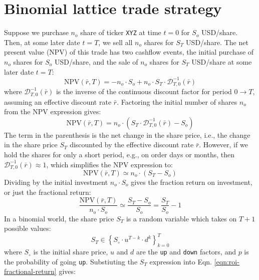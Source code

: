 \documentclass[11pt]{article}
\theoremstyle{definition}
\begin{document}
\section*{Binomial lattice trade strategy}
Suppose we purchase $n_{o}$ share of ticker \texttt{XYZ} at time $t=0$ for $S_{o}$ USD/share.
Then, at some later date $t=T$, we sell all $n_{o}$ shares for $S_{T}$ USD/share. 
The net present value (NPV) of this trade has two cashflow events, the initial purchase of $n_{o}$ shares for $S_{o}$ USD/share,
and the sale of $n_{o}$ shares for $S_{T}$ USD/share at some later date $t=T$:
\begin{equation}
\text{NPV}(\bar{r},T) = -n_{o}\cdot{S_{o}} + n_{o}\cdot{S_{T}}\cdot\mathcal{D}_{T,0}^{-1}(\bar{r})
\end{equation}
where $\mathcal{D}_{T,0}^{-1}(\bar{r})$ is the inverse of the continuous discount factor 
for period $0\rightarrow{T}$, assuming an effective discount rate $\bar{r}$. 
Factoring the initial number of shares $n_{o}$ from the NPV expression gives:
\begin{equation}
\text{NPV}(\bar{r},T) = n_{o}\cdot\left(S_{T}\cdot\mathcal{D}_{T,0}^{-1}(\bar{r}) - S_{o}\right)
\end{equation}
The term in the parenthesis is the net change in the share price, i.e., the change in the share price $S_{T}$ discounted by the effective discount rate $\bar{r}$.
However, if we hold the shares for only a short period, e.g., on order days or months, then $\mathcal{D}_{T,0}^{-1}(\bar{r})\approx{1}$, which
simplifies the NPV expression to:
\begin{equation}
\text{NPV}(\bar{r}, T) \simeq n_{o}\cdot(S_{T}-S_{o})
\end{equation}
Dividing by the initial investment $n_{o}\cdot{S_{o}}$ gives the fraction return on investment, or just the fractional return:
\begin{equation}\label{eqn:roi-fractional-return}
\frac{\text{NPV}(\bar{r}, T)}{n_{o}\cdot{S_{o}}} \simeq \frac{S_{T}-S_{o}}{S_{o}} = \frac{S_{T}}{S_{o}} - 1
\end{equation}
In a binomial world, the share price $S_{T}$ is a random variable which takes on $T+1$ possible values:
\begin{equation}
S_{T} \in \left\{S_{\circ}\cdot{u}^{T-k}\cdot{d}^{k}\right\}_{k=0}^{T}
\end{equation}
where $S_{\circ}$ is the initial share price, $u$ and $d$ are the \texttt{up} and \texttt{down} factors, and $p$ is the probability of going \texttt{up}.
Substiuting the $S_{T}$ expression into Eqn. \eqref{eqn:roi-fractional-return} gives:
\end{document}

